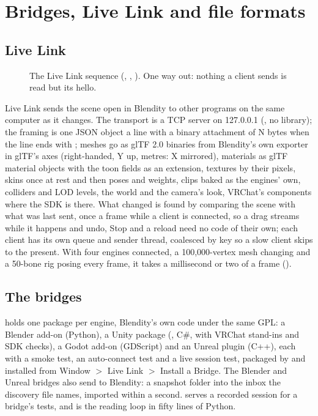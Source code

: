 \chapter{Bridges, Live Link and file formats}
\label{ch:bridges}

\section{Live Link}
\begin{figure}[H]
  \centering
  \resizebox{0.95\textwidth}{!}{}
  \caption{The Live Link sequence (, , ). One way out: nothing a client sends is read but its hello.}
  \label{fig:livelink}
\end{figure}

Live Link sends the scene open in Blendity to other programs on the same computer as it changes. The transport is a
TCP server on 127.0.0.1 (, no library); the framing is one JSON object a line with a
binary attachment of N bytes when the line ends with ; meshes go as glTF 2.0 binaries
\cite{Khronos2021Gltf} from Blendity's own exporter in glTF's axes (right-handed, Y up, metres: X mirrored), materials as
glTF material objects with the toon fields as an extension, textures by their pixels, skins once at rest and then
poses and weights, clips baked as the engines' own, colliders and LOD levels, the world and the camera's look, VRChat's
components where the SDK is there. What changed is found by comparing the scene with what was last sent, once a frame
while a client is connected, so a drag streams while it happens and undo, Stop and a reload need no code of their
own; each client has its own queue and sender thread, coalesced by key so a slow client skips to the present. With four
engines connected, a 100,000-vertex mesh changing and a 50-bone rig posing every frame, it takes a millisecond or two
of a frame ().

\section{The bridges}
 holds one package per engine, Blendity's own code under the same GPL: a Blender add-on (Python), a
Unity package (, C\#, with VRChat stand-ins and SDK checks), a Godot add-on (GDScript) and
an Unreal plugin (C++), each with a smoke test, an auto-connect test and a live session test, packaged by
 and installed from Window $>$ Live Link $>$ Install a Bridge. The Blender and Unreal
bridges also send to Blendity: a snapshot folder into the inbox the discovery file names, imported within a second.
 serves a recorded session for a bridge's tests, and  is
the reading loop in fifty lines of Python.


